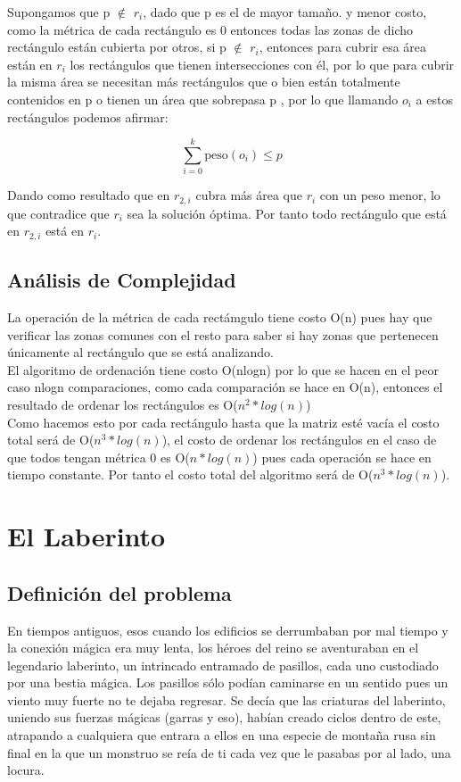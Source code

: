 \documentclass{article}
\begin{document}
Supongamos que p $\notin$ $r_i$, dado que p es el de mayor tamaño. y menor costo, como la métrica de cada rectángulo es 0 entonces todas las zonas de dicho rectángulo están cubierta por otros, si p $\notin$ $r_i$, entonces para cubrir esa área están en $r_i$ los rectángulos que tienen intersecciones con él, por lo que para cubrir la misma área se necesitan más rectángulos que o bien están totalmente contenidos en p o tienen un área que sobrepasa p , por lo que llamando $o_i$ a estos rectángulos podemos afirmar:

\begin{equation}
\sum_{i=0}^{k} \text{peso}(o_i) \leq p
\end{equation}

Dando como resultado que en $r_{2,i}$ cubra más área que $r_i$ con un peso menor, lo que contradice que $r_i$ sea la solución óptima. Por tanto todo rectángulo que está en $r_{2,i} $ está en $r_i$.

\subsection{Análisis de Complejidad}
    La operación de la métrica de cada rectámgulo tiene costo O(n) pues hay que verificar las zonas comunes con el resto para saber si hay zonas que pertenecen únicamente al rectángulo que se está analizando.\\

    El algoritmo de ordenación tiene costo O(nlogn) por lo que se hacen en el peor caso nlogn comparaciones, como cada comparación se hace en O(n), entonces el resultado de ordenar los rectángulos es O($n^2 * log(n)$)\\

    Como hacemos esto por cada rectángulo hasta que la matriz esté vacía el costo total será de O($n^3 * log(n)$), el costo de ordenar los rectángulos en el caso de que todos tengan métrica 0 es O($n*log(n)$) pues cada operación se hace en tiempo constante. Por tanto el costo total del algoritmo será de O($n^3 * log(n)$).

\section{El Laberinto}
	\subsection{Definición del problema}
	En tiempos antiguos, esos cuando los edificios se derrumbaban por mal tiempo y la conexión mágica era muy lenta, los héroes del reino se aventuraban en el legendario laberinto, un intrincado entramado de pasillos, cada uno custodiado por una bestia mágica. Los pasillos sólo podían caminarse en un sentido pues un viento muy fuerte no te dejaba regresar. Se decía que las criaturas del laberinto, uniendo sus fuerzas mágicas (garras y eso), habían creado ciclos dentro de este, atrapando a cualquiera que entrara a ellos en una especie de montaña rusa sin final en la que un monstruo se reía de ti cada vez que le pasabas por al lado, una locura.
\end{document}
